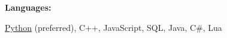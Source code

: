 \documentclass{resume/resume}
\begin{document}
%
%   
%
%
%
\vspace{-0.4em}
{\bf Languages:}
\vspace{-1.83em}
\begin{adjustwidth}{6em}{0pt}
    \href{https://github.com/search?q=user\%3ASpelkington+user\%3AUtahTriangle+extension\%3Apy+extension\%3Aipynb&type=Code&ref=advsearch&l=&l=}{Python} (preferred),
    C++,
    JavaScript,
    SQL,
    Java,
    C\#,
    Lua
\end{adjustwidth}

%
%
%
%
%
%
%
%
%
%
\end{document}
